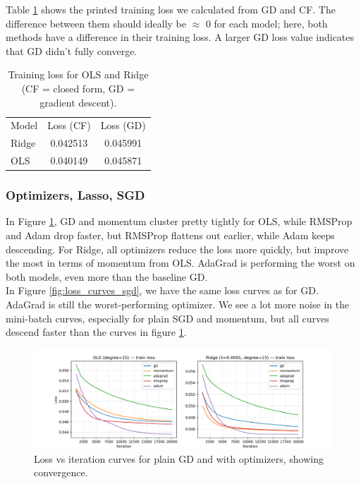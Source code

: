 \documentclass[amssymb,twocolumn,aps]{revtex4-2}
\begin{document}
Table \ref{tab:train-ols-ridge} shows the printed training loss we calculated from GD and CF. The difference between them should ideally be $\approx$ 0 for each model; here, both methods have a difference in their training loss. A larger GD loss value indicates that GD didn't fully converge.  

\begin{table}[h!]
\caption{Training loss for OLS and Ridge (CF = closed form, GD = gradient descent).}
\label{tab:train-ols-ridge}
\begin{ruledtabular}
\begin{tabular}{lcc}
Model & Loss (CF) & Loss (GD) \\
\colrule
Ridge & 0.042513 & 0.045991 \\
OLS   & 0.040149 & 0.045871 \\
\end{tabular}
\end{ruledtabular}
\end{table}



\subsubsection{Optimizers, Lasso, SGD}

In Figure \ref{fig:loss_curves_gd}, GD and momentum cluster pretty tightly for OLS, while RMSProp and Adam drop faster, but RMSProp flattens out earlier, while Adam keeps descending. For Ridge, all optimizers reduce the loss more quickly, but improve the most in terms of momentum from OLS. AdaGrad is performing the worst on both models, even more than the baseline GD. \\

In Figure \ref{fig:loss_curves_sgd}, we have the same loss curves as for GD. AdaGrad is still the worst-performing optimizer. We see a lot more noise in the mini-batch curves, especially for plain SGD and momentum, but all curves descend faster than the curves in figure \ref{fig:loss_curves_gd}. 

\begin{figure}[H]
    \centering
    \includegraphics[width=1\linewidth]{Project-1/Figures/Part_c_d_e_f_GD_optimizers_loss_curves.png}
    \caption{Loss vs iteration curves for plain GD and with optimizers, showing convergence.}
    \label{fig:loss_curves_gd}
\end{figure}
\end{document}
